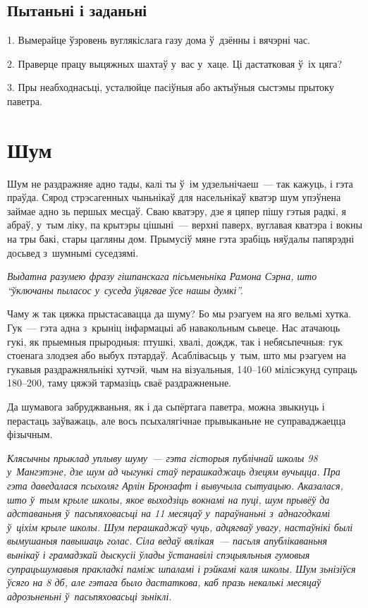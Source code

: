 \subsection*{Пытаньні і заданьні}

1. Вымерайце ўзровень вуглякіслага газу дома ў~дзённы і вячэрні час.

2. Праверце працу выцяжных шахтаў у~вас у~хаце. Ці дастатковая ў~іх цяга?

3. Пры неабходнасьці, усталюйце пасіўныя або актыўныя сыстэмы прытоку паветра.


\section{Шум}

Шум не раздражняе адно тады, калі ты ў~ім удзельнічаеш~--- так кажуць, і гэта праўда. Сярод стрэсагенных чыньнікаў для насельнікаў кватэр шум упэўнена займае адно зь першых месцаў. Сваю кватэру, дзе я цяпер пішу гэтыя радкі, я абраў, у~тым ліку, па крытэры цішыні~--- верхні паверх, вуглавая кватэра і вокны на тры бакі, стары цагляны дом. Прымусіў мяне гэта зрабіць няўдалы папярэдні досьвед з~шумнымі суседзямі. 

\emph{Выдатна разумею фразу гішпанскага пісьменьніка Рамона Сэрна, што ``ўключаны пыласос у~суседа ўцягвае ўсе нашы думкі''.}

Чаму ж так цяжка прыстасавацца да шуму? Бо мы рэагуем на яго вельмі хутка. Гук~--- гэта адна з~крыніц інфармацыі аб навакольным сьвеце. Нас атачаюць гукі, як прыемныя прыродныя: птушкі, хвалі, дождж, так і небясьпечныя: гук стоенага злодзея або выбух пэтардаў. Асаблівасьць у~тым, што мы рэагуем на гукавыя раздражняльнікі хутчэй, чым на візуальныя, 140--160 мілісэкунд супраць 180--200, таму цяжэй тармазіць сваё раздражненьне.


Да шумавога забруджваньня, як і да сьпёртага паветра, можна звыкнуць і перастаць заўважаць, але вось псыхалягічнае прывыканьне не суправаджаецца фізычным.

\emph{Клясычны прыклад уплыву шуму~--- гэта гісторыя публічнай школы 98 у~Мангэтэне, дзе шум ад чыгункі стаў перашкаджаць дзецям вучыцца. Пра гэта даведалася псыхоляг Арлін Бронзафт і вывучыла сытуацыю. Аказалася, што ў~тым крыле школы, якое выходзіць вокнамі на пуці, шум прывёў да адставаньня ў~пасьпяховасьці на 11 месяцаў у~параўнаньні з~аднагодкамі ў~ціхім крыле школы. Шум перашкаджаў чуць, адцягваў увагу, настаўнікі былі вымушаныя павышаць голас. Сіла ведаў вялікая~--- пасьля апублікаваньня вынікаў і грамадзкай дыскусіі ўлады ўстанавілі спэцыяльныя гумовыя супрацьшумавыя пракладкі паміж шпаламі і рэйкамі каля школы. Шум зьнізіўся ўсяго на 8 дб, але гэтага было дастаткова, каб празь некалькі месяцаў адрозьненьні ў~пасьпяховасьці зьніклі.}

